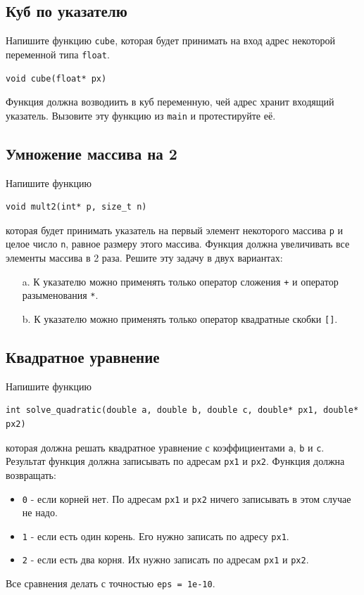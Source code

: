 \documentclass{article}
\begin{document}
\subsection{Куб по указателю}
Напишите функцию \texttt{cube}, которая будет принимать на вход адрес некоторой переменной типа \texttt{float}. 
\begin{lstlisting}
void cube(float* px)
\end{lstlisting}

Функция должна возводиить в куб переменную, чей адрес хранит входящий указатель. Вызовите эту функцию из \texttt{main} и протестируйте её.

\subsection{Умножение массива на 2}
Напишите функцию
\begin{lstlisting}
void mult2(int* p, size_t n)
\end{lstlisting}
которая будет принимать указатель на первый элемент некоторого массива \texttt{p} и целое число \texttt{n}, равное размеру этого массива. Функция должна увеличивать все элементы массива в 2 раза.
Решите эту задачу в двух вариантах:
\begin{enumerate}
\item[a.] К указателю можно применять только оператор сложения \texttt{+} и оператор разыменования \texttt{*}.
\item[b.] К указателю можно применять только оператор квадратные скобки \texttt{[]}.
\end{enumerate}



\subsection{Квадратное уравнение}
Напишите функцию
\begin{lstlisting}
int solve_quadratic(double a, double b, double c, double* px1, double* px2)
\end{lstlisting}
которая должна решать квадратное уравнение с коэффициентами \texttt{a}, \texttt{b} и \texttt{c}. Результат функция должна записывать по адресам \texttt{px1} и \texttt{px2}. Функция должна возвращать:
\begin{itemize}
\item \texttt{0} - если корней нет. По адресам \texttt{px1} и \texttt{px2} ничего записывать в этом случае не надо.
\item \texttt{1} - если есть один корень. Его нужно записать по адресу \texttt{px1}.
\item \texttt{2} - если есть два корня. Их нужно записать по адресам \texttt{px1} и \texttt{px2}.
\end{itemize}
Все сравнения делать с точностью \texttt{eps = 1e-10}.
\end{document}
